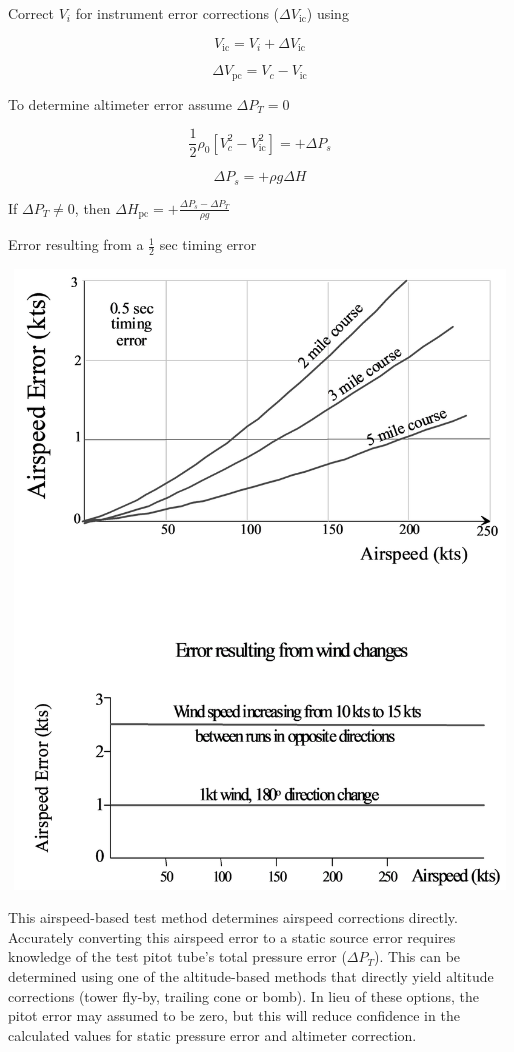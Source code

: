 \documentclass[
]{book}
\begin{document}
Correct \(V_i\) for instrument error corrections (\(\Delta V_{\mathrm{ic}}\)) using

\[V_{\mathrm{ic}} = V_i + \Delta V_{\mathrm{ic}} \]

\[\Delta V_{\mathrm{pc}} = V_c - V_{\mathrm{ic}} \]

To determine altimeter error assume \(\Delta P_T = 0\)

\[\frac{1}{2} \rho_0 \left[ V_c^2 - V_{\mathrm{ic}}^2 \right] = +\Delta P_s \]

\[\Delta P_s = +\rho g \Delta H \]

If \(\Delta P_T \ne 0\), then \(\Delta H_{\mathrm{pc}} = + \frac{\Delta P_s - \Delta P_T}{\rho g}\)

Error resulting from a \(\frac{1}{2}\) sec timing error

\includegraphics[width=5.5125in,height=6.4625in]{media/04/image21.svg}

This airspeed-based test method determines airspeed corrections directly. Accurately converting this airspeed error to a static source error requires knowledge of the test pitot tube's total pressure error (\(\Delta P_T\)). This can be determined using one of the altitude-based methods that directly yield altitude corrections (tower fly-by, trailing cone or bomb). In lieu of these options, the pitot error may assumed to be zero, but this will reduce confidence in the calculated values for static pressure error and altimeter correction.
\end{document}
